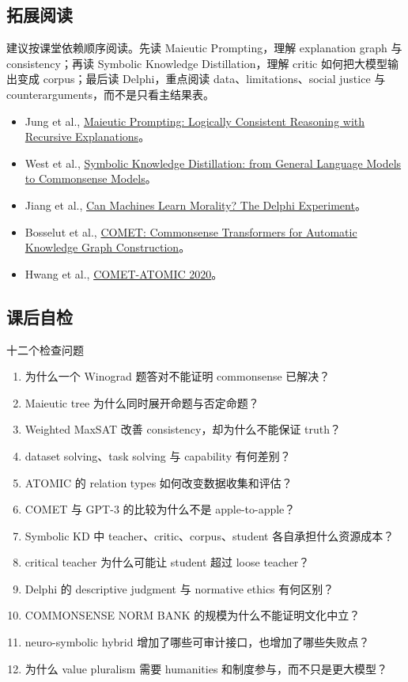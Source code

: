 \subsection{拓展阅读}

建议按课堂依赖顺序阅读。先读 Maieutic Prompting，理解 explanation graph 与 consistency；再读 Symbolic Knowledge Distillation，理解 critic 如何把大模型输出变成 corpus；最后读 Delphi，重点阅读 data、limitations、social justice 与 counterarguments，而不是只看主结果表。

\begin{itemize}
  \item Jung et al., \href{https://arxiv.org/abs/2205.11822}{Maieutic Prompting: Logically Consistent Reasoning with Recursive Explanations}。
  \item West et al., \href{https://arxiv.org/abs/2110.07178}{Symbolic Knowledge Distillation: from General Language Models to Commonsense Models}。
  \item Jiang et al., \href{https://arxiv.org/abs/2110.07574}{Can Machines Learn Morality? The Delphi Experiment}。
  \item Bosselut et al., \href{https://aclanthology.org/P19-1470/}{COMET: Commonsense Transformers for Automatic Knowledge Graph Construction}。
  \item Hwang et al., \href{https://arxiv.org/abs/2010.05953}{COMET-ATOMIC 2020}。
\end{itemize}

\subsection{课后自检}

\begin{importantbox}{十二个检查问题}
\begin{enumerate}
  \item 为什么一个 Winograd 题答对不能证明 commonsense 已解决？
  \item Maieutic tree 为什么同时展开命题与否定命题？
  \item Weighted MaxSAT 改善 consistency，却为什么不能保证 truth？
  \item dataset solving、task solving 与 capability 有何差别？
  \item ATOMIC 的 relation types 如何改变数据收集和评估？
  \item COMET 与 GPT-3 的比较为什么不是 apple-to-apple？
  \item Symbolic KD 中 teacher、critic、corpus、student 各自承担什么资源成本？
  \item critical teacher 为什么可能让 student 超过 loose teacher？
  \item Delphi 的 descriptive judgment 与 normative ethics 有何区别？
  \item COMMONSENSE NORM BANK 的规模为什么不能证明文化中立？
  \item neuro-symbolic hybrid 增加了哪些可审计接口，也增加了哪些失败点？
  \item 为什么 value pluralism 需要 humanities 和制度参与，而不只是更大模型？
\end{enumerate}
\end{importantbox}


